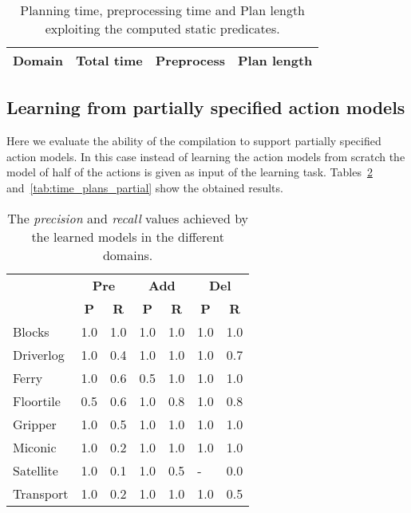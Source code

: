 \documentclass[letterpaper]{article} %
\begin{document}
\begin{table}[hbt!]
\begin{small}
	\begin{center}
		\begin{tabular}{l|c|c|c|}			 
			Domain & Total time & Preprocess & Plan length  \\
			\hline 			
		\end{tabular}
	\end{center}
        \end{small}
	\caption{\small Planning time, preprocessing time and Plan length exploiting the computed static predicates.}
	\label{tab:time_plans_static}	
\end{table}

\subsection{Learning from partially specified action models}

Here we evaluate the ability of the compilation to support partially specified action models. In this case instead of learning the action models from scratch the model of half of the actions is given as input of the learning task. Tables~\ref{tab:results_plans_partial} and~\ref{tab:time_plans_partial} show the obtained results.	

\begin{table}[hbt!]
\begin{small}
	\begin{center}
		\begin{tabular}{l|l|l|l|l|l|l|}
			 & \multicolumn{2}{|c|}{\bf Pre} & \multicolumn{2}{|c|}{\bf Add} & \multicolumn{2}{|c|}{\bf Del}  \\ \cline{2-7}			 
			  & \multicolumn{1}{|c|}{\bf P} & \multicolumn{1}{|c|}{\bf R} & \multicolumn{1}{|c|}{\bf P} & \multicolumn{1}{|c|}{\bf R} & \multicolumn{1}{|c|}{\bf P} & \multicolumn{1}{|c|}{\bf R} \\
			\hline
                        Blocks & 1.0 & 1.0 & 1.0 & 1.0 & 1.0 & 1.0 \\
			Driverlog & 1.0 & 0.4 & 1.0 & 1.0 & 1.0 & 0.7 \\
			Ferry & 1.0 & 0.6 & 0.5 & 1.0 & 1.0 & 1.0 \\
			Floortile & 0.5 & 0.6 & 1.0 & 0.8 & 1.0 & 0.8 \\
			Gripper & 1.0 & 0.5 & 1.0 & 1.0 & 1.0 & 1.0 \\
			Miconic & 1.0 & 0.2 & 1.0 & 1.0 & 1.0 & 1.0 \\
			Satellite & 1.0 & 0.1 & 1.0 & 0.5 & - & 0.0 \\
			Transport & 1.0 & 0.2 & 1.0 & 1.0 & 1.0 & 0.5			
		\end{tabular}
	\end{center}
	\end{small}
\caption{\small The {\em precision} and {\em recall} values achieved by the learned models in the different domains.}
\label{tab:results_plans_partial}
\end{table}
\end{document}
